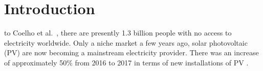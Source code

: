 \documentclass[journal]{IEEEtran}
\begin{document}
\section{Introduction}
% 
% 
% 
% 
 to Coelho et al.~\cite{Coelho}, there are presently 1.3 billion people with no access to electricity worldwide. 
%
Only a niche market a few years ago, solar photovoltaic (PV) are now becoming a mainstream electricity provider. 
There was an increase of approximately 50\% from 2016 to 2017 in terms of new installations of PV \cite{EPIA}. 
% 
%
\end{document}
